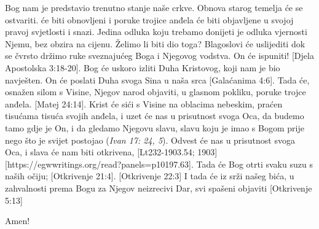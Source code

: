 Bog nam je predstavio trenutno stanje naše crkve. Obnova starog temelja će se ostvariti.  će biti obnovljeni i poruke trojice anđela će biti objavljene u svojoj pravoj svjetlosti i snazi. Jedina odluka koju trebamo donijeti je odluka vjernosti Njemu, bez obzira na cijenu. Želimo li biti dio toga? Blagoslovi će uslijediti dok se čvrsto držimo ruke sveznajućeg Boga i Njegovog vodstva.  On će ispuniti! [Djela Apostolska 3:18-20]. Bog će uskoro izliti Duha Kristovog, koji nam je bio navješten. On će poslati Duha svoga Sina u naša srca [Galaćanima 4:6]. Tada će, osnažen silom s Visine, Njegov narod objaviti, u glasnom pokliku, poruke trojce anđela. [Matej 24:14]. Krist će sići s Visine na oblacima nebeskim, praćen tisućama tisuća svojih anđela, i uzet će nas u prisutnost svoga Oca, da budemo tamo gdje je On, i da gledamo Njegovu slavu, slavu koju je imao s Bogom prije nego što je svijet postojao (\textit{Ivan 17: 24, 5}). Odvest će nas u prisutnost svoga Oca, i slava će nam biti otkrivena, [Lt232-1903.54; 1903][https://egwwritings.org/read?panels=p10197.63]. Tada će Bog otrti svaku suzu s naših očiju; [Otkrivenje 21:4]. [Otkrivenje 22:3] I tada će iz srži našeg bića, u zahvalnosti prema Bogu za Njegov neizrecivi Dar, svi spašeni  objaviti [Otkrivenje 5:13]

Amen!

